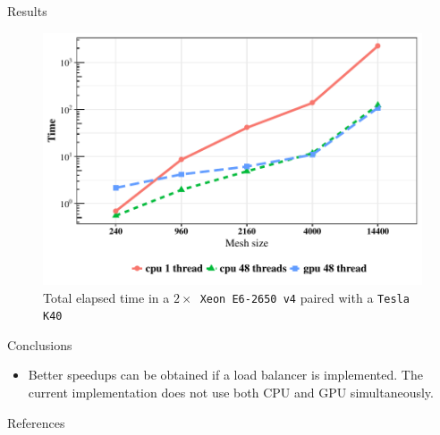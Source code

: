 \documentclass{beamer}
\begin{document}
\begin{frame}[fragile]
\begin{columns}[T]
\begin{column}{.46\textwidth}
\begin{block}{Results}
\begin{figure}[ht]
	\centering
	\includegraphics[scale=1.4]{total_brucutuiv.pdf}
	\caption{Total elapsed time in a \texttt{$2\times$ Xeon E6-2650 v4} paired with a \texttt{Tesla K40}}
	\label{fig:total_brucutuiv}
	\label{fig:brucutuiv}
\end{figure}

\end{block}

\begin{block}{Conclusions}\justifying
\begin{itemize}

\item Better speedups can be obtained if a load balancer is implemented. The current implementation does not use both CPU and GPU simultaneously.


\end{itemize}
\end{block}


\begin{block}{References}
%

{\footnotesize
}
%
%
%
\end{block}

\end{column}
\end{columns}


\end{frame}
\end{document}
